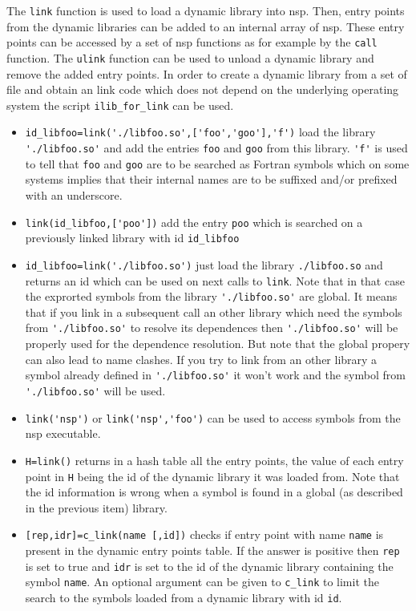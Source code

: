 \begin{mandescription}
  The \verb!link! function is used to load a dynamic library into nsp. 
  Then, entry points from the dynamic libraries can be added to an internal array of 
  nsp. These entry points can be accessed by a set of nsp functions as for example 
  by the \verb!call! function. The \verb!ulink! function can be used to unload 
  a dynamic library and remove the added entry points. 
  In order to create a dynamic library from a set of file and obtain an link 
  code which does not depend on the underlying operating system the script 
  \verb!ilib_for_link! can be used.
  \begin{itemize} 
  \item \verb!id_libfoo=link('./libfoo.so',['foo','goo'],'f')! load the library 
    \verb!'./libfoo.so'! and add the entries \verb!foo! and \verb!goo! from this 
    library. \verb!'f'! is used to tell that \verb!foo! and \verb!goo! are to be 
    searched as Fortran symbols which on some systems implies that their internal 
    names are to be suffixed and/or prefixed with an underscore. 
  \item \verb!link(id_libfoo,['poo'])! add the entry \verb!poo! which is searched 
    on a previously linked library with id \verb!id_libfoo! 
  \item \verb!id_libfoo=link('./libfoo.so')! just load the library \verb!./libfoo.so! 
    and returns an id which can be used on next calls to \verb!link!. 
    Note that in that case the exprorted symbols from the library \verb!'./libfoo.so'! 
    are global. It means that if you link in a subsequent call an other library 
    which need the symbols from \verb!'./libfoo.so'! to resolve its dependences 
    then \verb!'./libfoo.so'! will be properly used for the dependence resolution. 
    But note that the global propery can also lead to name clashes. If you try 
    to link from an other library a symbol already defined in \verb!'./libfoo.so'! 
    it won't work and the symbol from \verb!'./libfoo.so'! will be used. 
  \item \verb!link('nsp')! or \verb!link('nsp','foo')! can be used to access 
    symbols from the nsp executable.
  \item \verb!H=link()! returns in a hash table all the entry points, the value 
    of each entry point in \verb!H! being the id of the dynamic library it was loaded 
    from. Note that the id information is wrong when a symbol is found in a 
    global (as described in the previous item) library.  
  \item \verb![rep,idr]=c_link(name [,id])! checks if entry point with name \verb!name! 
    is present in the dynamic entry points table. If the answer is positive then \verb!rep!
    is set to true and \verb!idr! is set to the id of the dynamic library containing the 
    symbol \verb!name!. An optional argument can be given to \verb!c_link! to limit the search 
    to the symbols loaded from a dynamic library with id \verb!id!.
  \end{itemize}
\end{mandescription} 
\begin{manseealso}
\end{manseealso}

